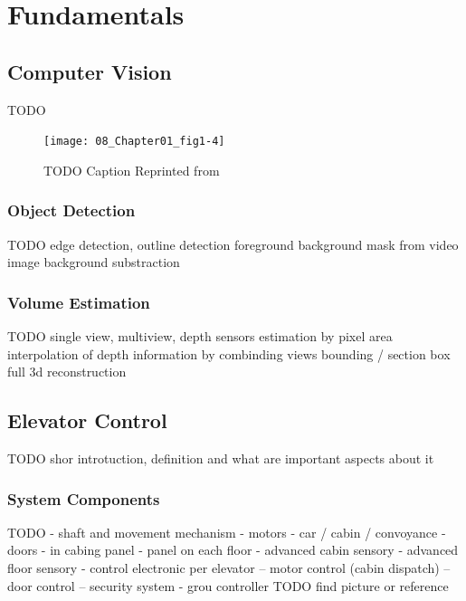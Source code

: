 \chapter{Fundamentals}
\label{chap:sota}

\section{Computer Vision}

TODO

\begin{figure}
	\centering
	\texttt{[image: 08\_Chapter01\_fig1-4]}
	\caption[]{\label{fig:sota:imageengineering} TODO Caption
	Reprinted from \textcite[][Chapter~1]{zhang2017imageprocessing}}
\end{figure}

\subsection{Object Detection}

TODO
edge detection, outline detection
foreground background mask from video image
background substraction

\subsection{Volume Estimation}

TODO
single view, multiview, depth sensors
estimation by pixel area
interpolation of depth information by combinding views
bounding / section box
full 3d reconstruction

\section{Elevator Control}
TODO shor introtuction, definition and what are important aspects about it

\subsection{System Components}
TODO
- shaft and movement mechanism
- motors
- car / cabin / convoyance
- doors
- in cabing panel
- panel on each floor
- advanced cabin sensory
- advanced floor sensory
- control electronic per elevator
-- motor control (cabin dispatch)
-- door control
-- security system
- grou controller
TODO find picture or reference

